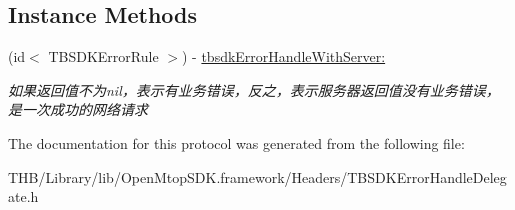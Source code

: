 \subsection*{Instance Methods}
\begin{DoxyCompactItemize}
\item 
\mbox{\label{protocol_t_b_s_d_k_error_handle_delegate_01-p_af6bd0cece431c471b312b1dae44c3e4d}} 
(id$<$ T\+B\+S\+D\+K\+Error\+Rule $>$) -\/ \mbox{\hyperlink{protocol_t_b_s_d_k_error_handle_delegate_01-p_af6bd0cece431c471b312b1dae44c3e4d}{tbsdk\+Error\+Handle\+With\+Server\+:}}
\begin{DoxyCompactList}\small\item\em 如果返回值不为nil，表示有业务错误，反之，表示服务器返回值没有业务错误，是一次成功的网络请求 \end{DoxyCompactList}\end{DoxyCompactItemize}


The documentation for this protocol was generated from the following file\+:\begin{DoxyCompactItemize}
\item 
T\+H\+B/\+Library/lib/\+Open\+Mtop\+S\+D\+K.\+framework/\+Headers/T\+B\+S\+D\+K\+Error\+Handle\+Delegate.\+h\end{DoxyCompactItemize}
